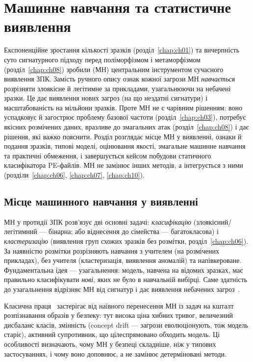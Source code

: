 \chapter{Машинне навчання та статистичне виявлення}
\label{chap:ch09}

Експоненційне зростання кількості зразків (розділ~\ref{chap:ch01}) та вичерпність суто сигнатурного підходу перед поліморфізмом і метаморфізмом (розділ~\ref{chap:ch08}) зробили  (МН) центральним інструментом сучасного виявлення ЗПК. Замість ручного опису ознак кожної загрози МН \emph{навчається} розрізняти злоякісне й легітимне за прикладами, узагальнюючи на небачені зразки. Це дає виявлення нових загроз (на що нездатні сигнатури) і масштабованість на мільйони зразків. Проте МН не є чарівним рішенням: воно успадковує й загострює проблему базової частоти (розділ~\ref{chap:ch03}), потребує якісних розмічених даних, вразливе до змагальних атак (розділ~\ref{chap:ch08}) і дає рішення, які важко пояснити. Розділ розглядає місце МН у виявленні, ознаки й подання зразків, типові моделі, оцінювання якості, змагальне машинне навчання та практичні обмеження, і завершується кейсом побудови статичного класифікатора PE-файлів. МН не замінює інших методів, а інтегрується з ними (розділи~\ref{chap:ch06}, \ref{chap:ch07}, \ref{chap:ch10}).

\section{Місце машинного навчання у виявленні}\label{sec:ch09-place}

МН у протидії ЗПК розв'язує дві основні задачі: \emph{класифікацію} (злоякісний/легітимний --- бінарна; або віднесення до сімейства --- багатокласова) і \emph{кластеризацію} (виявлення груп схожих зразків без розмітки, розділ~\ref{chap:ch06}). За наявністю розмітки розрізняють навчання з учителем (на розмічених прикладах), без учителя (кластеризація, виявлення аномалій) та напівкероване. Фундаментальна ідея --- узагальнення: модель, навчена на відомих зразках, має правильно класифікувати \emph{нові}, яких не було в навчальній вибірці. Саме здатність до узагальнення відрізняє МН від сигнатур і дає виявлення небачених загроз~\cite{ch09:ucci,ch09:gibert}.

Класична праця~\cite{ch09:sommer} застерігає від наївного перенесення МН із задач на кшталт розпізнавання образів у безпеку: тут висока ціна хибних тривог, величезний дисбаланс класів, змінність (concept drift --- загрози еволюціонують, тож модель старіє), активний супротивник, що цілеспрямовано обходить модель. Ці особливості визначають, чому МН у безпеці складніше, ніж у типових застосуваннях, і чому воно доповнює, а не замінює детерміновані методи.


